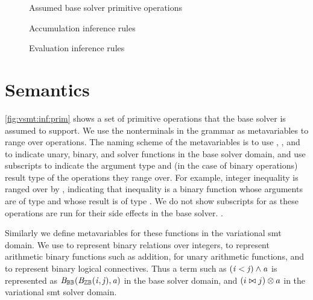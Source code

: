 \begin{figure}
  
  \caption{Assumed base solver primitive operations}%
  \label{fig:vsmt:inf:prim}
\end{figure}
%
\begin{figure}
  
  \caption{Accumulation inference rules}%
  \label{fig:vsmt:inf:acc}
\end{figure}
%
\begin{figure}
  
  \caption{Evaluation inference rules}%
  \label{fig:vsmt:inf:eval}
\end{figure}
%


\section{Semantics}
%
\autoref{fig:vsmt:inf:prim} shows a set of primitive operations that the base
solver is assumed to support. We use the nonterminals in the grammar as
metavariables to range over operations. The naming scheme of the metavariables
is to use \uop{}, \bop{}, and \sop{} to indicate unary, binary, and solver
functions in the base solver domain, and use subscripts to indicate the
argument type and (in the case of binary operations) result type of the
operations they range over.
%
For example, integer inequality is ranged over by \bib{}, indicating that
inequality is a binary function whose arguments are of type \integers{} and
whose result is of type \booleans{}.
%
We do not show subscripts for \sop{} as these operations are run for their side
effects in the base solver.
%
.

%
%
Similarly we define metavariables for these
functions in the variational \ac{smt} domain. We use \inequalities{} to
represent binary relations over integers, \integerFuncs{} to represent
arithmetic binary functions such as addition, \integerUnary{} for unary
arithmetic functions, and \boolFuncs{} to represent binary logical connectives.
Thus a term such as $\mathit{(i < j) \wedge a}$ is represented as
$\mathit{\mathit{B}_{\mathbb{B}{}\mathbb{B}}{}(\mathit{B}_{\mathbb{Z}{}\mathbb{B}}{}(i,j),a)}$ in the base solver domain, and $(i \bowtie{}{}
j) \otimes{}{} a$ in the variational \ac{smt} solver domain.

